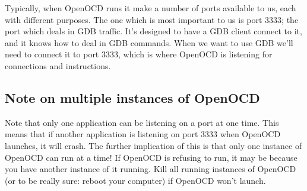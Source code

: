 Typically, when OpenOCD runs it make a number of ports available to us, each with different purposes. The one which is most important to us is port 3333; the port which deals in GDB traffic. It's designed to have a GDB client connect to it, and it knows how to deal in GDB commands. When we want to use GDB we'll need to connect it to port 3333, which is where OpenOCD is listening for connections and instructions.\\

\subsection{Note on multiple instances of OpenOCD}
Note that only one application can be listening on a port at one time. This means that if another application is listening on port 3333 when OpenOCD launches, it will crash. The further implication of this is that only one instance of OpenOCD can run at a time! If OpenOCD is refusing to run, it may be because you have another instance of it running. Kill all running instances of OpenOCD (or to be really sure: reboot your computer) if OpenOCD won't launch.

